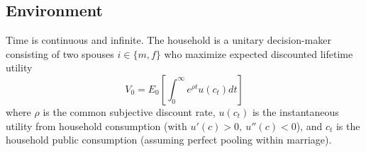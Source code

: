 \documentclass[11pt]{article}
\begin{document}















\subsection*{Environment}
Time is continuous and infinite. The household is a unitary decision-maker consisting of two spouses $i\in\{m,f\}$ who maximize expected discounted lifetime utility \begin{equation*}
    V_0=E_0\left[\int_0^\infty e^{\rho t}u(c_t)dt\right]
\end{equation*} where $\rho$ is the common subjective discount rate, $u(c_t)$ is the instantaneous utility from household consumption (with $u'(c)>0,\ u''(c)<0$), and $c_t$ is the household public consumption (assuming perfect pooling within marriage). 
\end{document}
